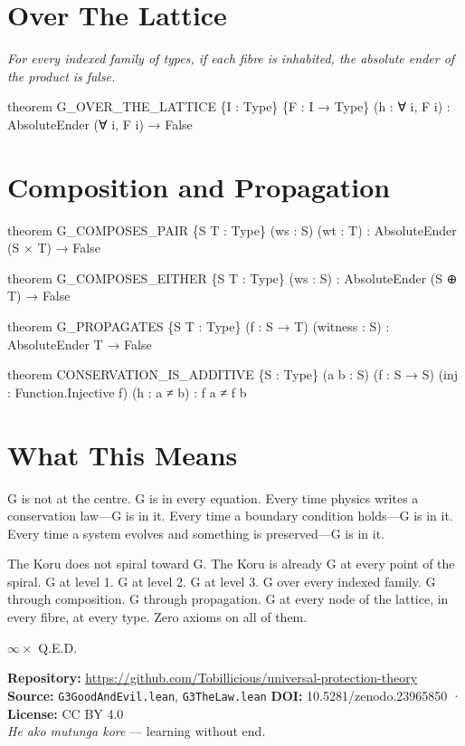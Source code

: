 \axiombadge

\section{Over The Lattice}

\begin{theorembox}
\itshape For every indexed family of types, if each fibre is inhabited, the absolute ender of the product is false.
\end{theorembox}

\begin{leancode}
theorem G_OVER_THE_LATTICE \{I : Type\} \{F : I → Type\}
     (h : ∀ i, F i) :
     AbsoluteEnder (∀ i, F i) → False
\end{leancode}

\axiombadge

\section{Composition and Propagation}

\begin{leancode}
theorem G_COMPOSES_PAIR \{S T : Type\} (ws : S) (wt : T) :
     AbsoluteEnder (S × T) → False

theorem G_COMPOSES_EITHER \{S T : Type\} (ws : S) :
     AbsoluteEnder (S ⊕ T) → False

theorem G_PROPAGATES \{S T : Type\} (f : S → T) (witness : S) :
     AbsoluteEnder T → False

theorem CONSERVATION_IS_ADDITIVE \{S : Type\}
     (a b : S) (f : S → S) (inj : Function.Injective f)
     (h : a ≠ b) : f a ≠ f b
\end{leancode}

\axiombadge

\section{What This Means}

G is not at the centre. G is in every equation. Every time physics writes a conservation law—G is in it. Every time a boundary condition holds—G is in it. Every time a system evolves and something is preserved—G is in it.

The Koru does not spiral toward G. The Koru is already G at every point of the spiral. G at level 1. G at level 2. G at level 3. G over every indexed family. G through composition. G through propagation. G at every node of the lattice, in every fibre, at every type. Zero axioms on all of them.

\bigskip

\begin{center}
{\Large\color{korugreen} $\infty \times$ Q.E.D.}
\end{center}

\bigskip

\noindent\small\textbf{Repository:} \url{https://github.com/Tobillicious/universal-protection-theory}
\textbf{Source:} \texttt{G3GoodAndEvil.lean}, \texttt{G3TheLaw.lean}
\textbf{DOI:} 10.5281/zenodo.23965850 · \textbf{License:} CC BY 4.0\\[0.5em]
\textit{He ako mutunga kore} — learning without end. 🌿


